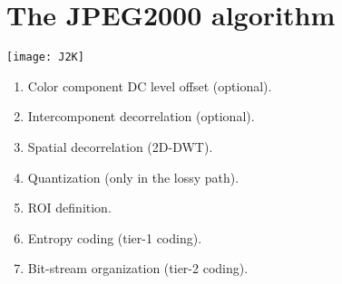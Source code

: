 \begin{comment}
\section{>Qu'e es la codificaci'on progresiva?}
\begin{itemize}
\item Debido a la gran cantidad de datos que se generan, la
  transmisi'on de las im'agenes, incluso en un formato comprimido,
  necesitan un cierto tiempo. Cuando es posible reconstruir la imagen
  en el receptor con un sub-conjunto del stream de datos comprimidos,
  hablaremos de codificaci'on progresiva de im'agenes.
  \vspace{-1ex}
  \begin{center}
    \texttt{[image: rate-distortion]}
  \end{center}
\end{itemize}
\end{comment}

\section{The JPEG2000 algorithm}
\begin{center}
  \texttt{[image: J2K]}
\end{center}
\begin{enumerate}
\item Color component DC level offset (optional).
\item Intercomponent decorrelation (optional).
\item Spatial decorrelation (2D-DWT).
\item Quantization (only in the lossy path).
\item ROI definition.
\item Entropy coding (tier-1 coding).
\item Bit-stream organization (tier-2 coding).
\end{enumerate}

